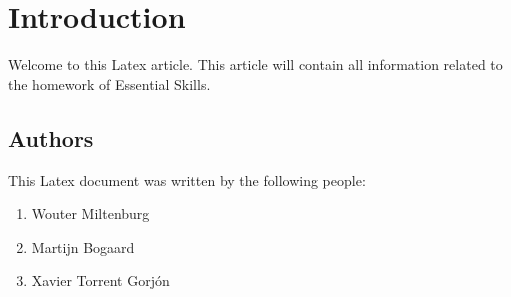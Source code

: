 \chapter{Introduction}
\label{chap:introduction}
Welcome to this Latex article. This article will contain all information related to the homework of Essential Skills.

\section{Authors}
This Latex document was written by the following people:
\begin{enumerate}
\item Wouter Miltenburg
\item Martijn Bogaard
\item Xavier Torrent Gorj\'on
\end{enumerate}
